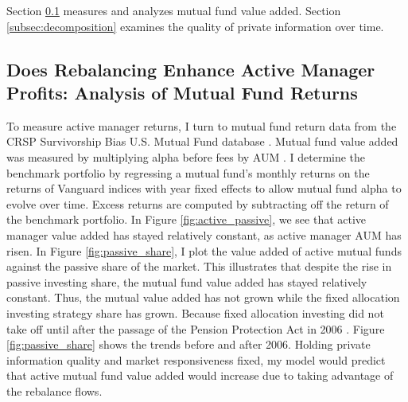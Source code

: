 \documentclass[12pt]{article}
\begin{document}
Section \ref{subsec:active_proftis} measures and analyzes mutual fund value added. Section \ref{subsec:decomposition} examines the quality of private information over time.


\subsection{Does Rebalancing Enhance Active Manager Profits: Analysis of Mutual Fund Returns} \label{subsec:active_proftis}

To measure active manager returns, I turn to mutual fund return data from the CRSP Survivorship Bias U.S. Mutual Fund database \citep{Carhart}. Mutual fund value added was measured by multiplying alpha before fees by AUM \citep{BERK2015}. I determine the benchmark portfolio by regressing a mutual fund's monthly returns on the returns of Vanguard indices with year fixed effects to allow mutual fund alpha to evolve over time. Excess returns are computed by subtracting off the return of the benchmark portfolio. In Figure \ref{fig:active_passive}, we see that active manager value added has stayed relatively constant, as active manager AUM has risen. In Figure \ref{fig:passive_share}, I plot the value added of active mutual funds against the passive share of the market. This illustrates that despite the rise in passive investing share, the mutual fund value added has stayed relatively constant. Thus, the mutual value added has not grown while the fixed allocation investing strategy share has grown. Because fixed allocation investing did not take off until after the passage of the Pension Protection Act in 2006 \citep{vanguard20years}. Figure \ref{fig:passive_share} shows the trends before and after 2006. Holding private information quality and market responsiveness fixed, my model would predict that active mutual fund value added would increase due to taking advantage of the rebalance flows. 
\end{document}
